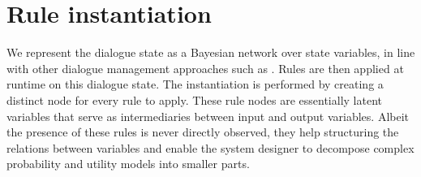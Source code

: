 

\section{Rule instantiation}
\label{sec:ruleinstantiation}

We represent the dialogue state as a Bayesian network over state variables, in line with other dialogue management approaches such as \cite{Thomson:2010:BUD:1772996.1773040,bui2010}. Rules are then applied at runtime on this dialogue state.  The instantiation is performed by creating a distinct node for every rule to apply. These rule nodes are essentially latent variables that serve as intermediaries between input and output variables.  Albeit the presence of these rules is never directly observed, they help structuring the relations between variables and enable the system designer to decompose complex probability and utility models into smaller parts.   %

